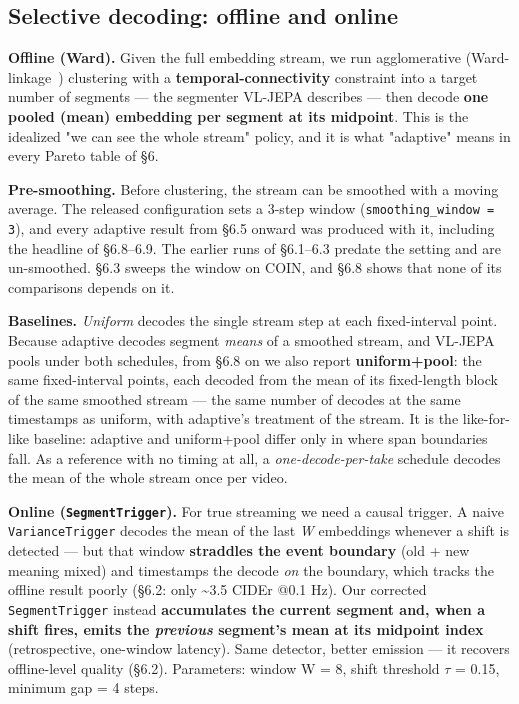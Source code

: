 \subsection{Selective decoding: offline and online}

\textbf{Offline (Ward).} Given the full embedding stream, we run agglomerative (Ward-linkage~\cite{ward1963}) clustering with a \textbf{temporal-connectivity} constraint into a target number of segments --- the segmenter VL-JEPA describes --- then decode \textbf{one pooled (mean) embedding per segment at its midpoint}. This is the idealized "we can see the whole stream" policy, and it is what "adaptive" means in every Pareto table of \S6.

\textbf{Pre-smoothing.} Before clustering, the stream can be smoothed with a moving average. The released configuration sets a 3-step window (\texttt{smoothing\_window = 3}), and every adaptive result from \S6.5 onward was produced with it, including the headline of \S6.8--6.9. The earlier runs of \S6.1--6.3 predate the setting and are un-smoothed. \S6.3 sweeps the window on COIN, and \S6.8 shows that none of its comparisons depends on it.

\textbf{Baselines.} \emph{Uniform} decodes the single stream step at each fixed-interval point. Because adaptive decodes segment \emph{means} of a smoothed stream, and VL-JEPA pools under both schedules, from \S6.8 on we also report \textbf{uniform+pool}: the same fixed-interval points, each decoded from the mean of its fixed-length block of the same smoothed stream --- the same number of decodes at the same timestamps as uniform, with adaptive's treatment of the stream. It is the like-for-like baseline: adaptive and uniform+pool differ only in where span boundaries fall. As a reference with no timing at all, a \emph{one-decode-per-take} schedule decodes the mean of the whole stream once per video.

\textbf{Online (\texttt{SegmentTrigger}).} For true streaming we need a causal trigger. A naive \texttt{VarianceTrigger} decodes the mean of the last \emph{W} embeddings whenever a shift is detected --- but that window \textbf{straddles the event boundary} (old + new meaning mixed) and timestamps the decode \emph{on} the boundary, which tracks the offline result poorly (\S6.2: only \textasciitilde{}3.5 CIDEr @0.1 Hz). Our corrected \texttt{SegmentTrigger} instead \textbf{accumulates the current segment and, when a shift fires, emits the \emph{previous} segment's mean at its midpoint index} (retrospective, one-window latency). Same detector, better emission --- it recovers offline-level quality (\S6.2). Parameters: window W = 8, shift threshold $\tau$ = 0.15, minimum gap = 4 steps.

